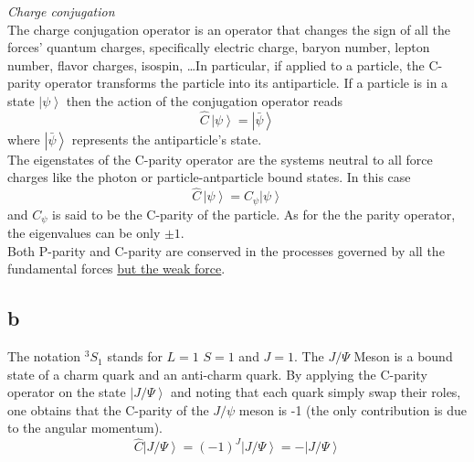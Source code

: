 \raggedright\emph{Charge conjugation} \\
\vspace{10pt} 
The charge conjugation operator is an operator that changes the sign of all the forces' quantum charges, specifically electric charge, baryon number, lepton number, flavor charges, isospin, \dots In particular, if applied to a particle, the C-parity operator 
transforms the particle into its antiparticle. If a particle is in a state $\left| \psi \right\rangle$ then the action of the conjugation operator reads 
\begin{equation*}
    \hat C \, \left| \psi \right\rangle = \left| \bar\psi \right\rangle
\end{equation*}
where $\left| \bar\psi \right\rangle$ represents the antiparticle's state. \\
The eigenstates of the C-parity operator are the systems neutral to all force charges like the photon or particle-antparticle bound states. In this case
\begin{equation*}
    \hat C \, \left| \psi \right\rangle = C_{\psi} \left| \psi \right\rangle
\end{equation*}
and $C_{\psi}$ is said to be the C-parity of the particle. As for the the parity operator, the eigenvalues can be only $\pm 1$. \\
Both P-parity and C-parity are conserved in the processes governed by all the fundamental forces \href{https://en.wikipedia.org/wiki/Weak_interaction#Violation_of_symmetry}{but the weak force}.

\subsection*{b}
The notation $^3S_1$ stands for $L=1$ $S=1$ and $J=1$. The $J/\Psi$ Meson is a bound state of a charm quark and an anti-charm quark. By applying the C-parity operator on the state $\left|J/\Psi\right\rangle$ and noting that each quark simply swap their roles,
one obtains that the C-parity of the $J/\psi$ meson is -1 (the only contribution is due to the angular momentum).
\begin{equation*}
    \hat C \left|J/\Psi\right\rangle = (-1)^J\left|J/\Psi\right\rangle = -\left|J/\Psi\right\rangle
\end{equation*}
